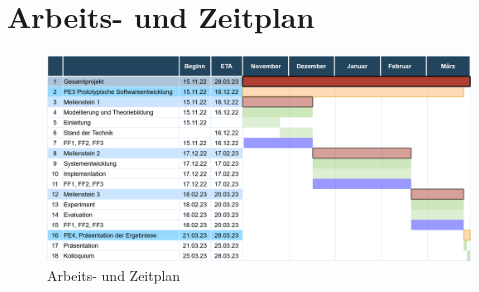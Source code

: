 \section{Arbeits- und Zeitplan}

\begin{figure}[h]
    \centering
    \includegraphics[width=\textwidth]{pictures/zeitplan.png}
    \caption{Arbeits- und Zeitplan}
    \label{fig:zeitplan}
\end{figure}

